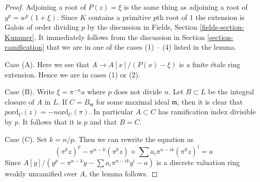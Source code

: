 \documentclass[10pt,a4paper]{amsart}
\theoremstyle{plain}
\theoremstyle{definition}
\theoremstyle{remark}
\numberwithin{equation}{subsection}
\begin{document}
\begin{proof}
Adjoining a root of $P(z) = \xi$ is the same thing as adjoining a root
of $y^p = w^p(1 + \xi)$. Since $K$ contains a primitive $p$th root of $1$
the extension is Galois of order dividing $p$ by the discussion in
Fields, Section \ref{fields-section-Kummer}.
It immediately follows from the discussion in
Section \ref{section-ramification} that we are in one of the cases (1) -- (4)
listed in the lemma.

\medskip\noindent
Case (A). Here we see that $A \to A[x]/(P(x) - \xi)$ is a finite
\'etale ring extension. Hence we are in cases (1) or (2).

\medskip\noindent
Case (B). Write $\xi = \pi^{-n}a$ where $p$ does not divide $n$.
Let $B \subset L$ be the integral closure of $A$ in $L$.
If $C = B_\mathfrak m$ for some maximal ideal $\mathfrak m$,
then it is clear that $p \text{ord}_C(z) = -n \text{ord}_C(\pi)$.
In particular $A \subset C$ has ramification index divisible by $p$.
It follows that it is $p$ and that $B = C$.

\medskip\noindent
Case (C). Set $k = n/p$. Then we can rewrite the equation as
$$
(\pi^kz)^p - \pi^{n - k} (\pi^kz) + \sum a_i \pi^{n - ik} (\pi^kz)^i = a
$$
Since $A[y]/(y^p - \pi^{n - k}y - \sum  a_i \pi^{n - ik} y^i - a)$
is a discrete valuation ring weakly unramified over $A$, the lemma follows.
\end{proof}
\end{document}
